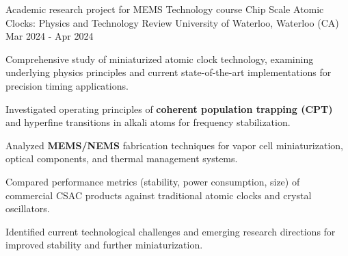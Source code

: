
\cventry
{Academic research project for MEMS Technology course}
{Chip Scale Atomic Clocks: Physics and Technology Review}
{University of Waterloo, Waterloo (CA)}
{Mar 2024 - Apr 2024}
{
    Comprehensive study of miniaturized atomic clock technology, examining underlying physics principles and current state-of-the-art implementations for precision timing applications.
    \newline
    \vspace{4mm}
    \begin{cvitems}
        \item {Investigated operating principles of \textbf{coherent population trapping (CPT)} and hyperfine transitions in alkali atoms for frequency stabilization.}
        \item {Analyzed \textbf{MEMS/NEMS} fabrication techniques for vapor cell miniaturization, optical components, and thermal management systems.}
        \item {Compared performance metrics (stability, power consumption, size) of commercial CSAC products against traditional atomic clocks and crystal oscillators.}
        \item {Identified current technological challenges and emerging research directions for improved stability and further miniaturization.}
    \end{cvitems}
}
